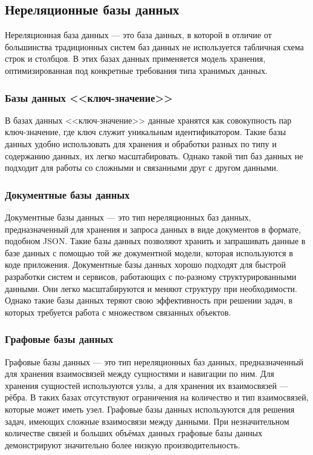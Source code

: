 \subsection{Нереляционные базы данных}

Нереляционная база данных --- это база данных, в которой в отличие от большинства традиционных систем баз данных не используется табличная схема строк и столбцов. В этих базах данных применяется модель хранения, оптимизированная под конкретные требования типа хранимых данных.

\subsubsection{Базы данных <<ключ-значение>>}

В базах данных <<ключ-значение>> данные хранятся как совокупность пар ключ-значение, где ключ служит уникальным идентификатором. Такие базы данных удобно использовать для хранения и обработки разных по типу и содержанию данных, их легко масштабировать. Однако такой тип баз данных не подходит для работы со сложными и связанными друг с другом данными.

\subsubsection{Документные базы данных}

Документные базы данных --- это тип нереляционных баз данных, предназначенный для хранения и запроса данных в виде документов в формате, подобном JSON. Такие базы данных позволяют хранить и запрашивать данные в базе данных с помощью той же документной модели, которая используются в коде приложения. Документные базы данных хорошо подходят для быстрой разработки систем и сервисов, работающих с по-разному структурированными данными. Они легко масштабируются и меняют структуру при необходимости. Однако такие базы данных теряют свою эффективность при решении задач, в которых требуется работа с множеством связанных объектов.

\subsubsection{Графовые базы данных}

Графовые базы данных --- это тип нереляционных баз данных, предназначенный для хранения взаимосвязей между сущностями и навигации по ним. Для хранения сущностей используются узлы, а для хранения их взаимосвязей --- рёбра. В таких базах отсутствуют ограничения на количество и тип взаимосвязей, которые может иметь узел. Графовые базы данных используются для решения задач, имеющих сложные взаимосвязи между данными. При незначительном количестве связей и больших объёмах данных графовые базы данных демонстрируют значительно более низкую производительность.

